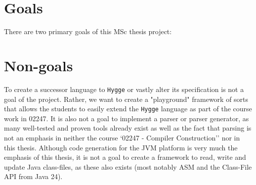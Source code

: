 \section{Goals}

There are two primary goals of this MSc thesis project:

\section{Non-goals}

To create a successor language to \texttt{Hygge} or vastly alter its specification is not a goal of the project. Rather, we want to create a
"playground" framework of sorts that allows the students to easily extend the \texttt{Hygge} language as part of the course work in 02247. 
It is also not a goal to implement a parser or parser generator, as many well-tested and proven tools already exist as well as the fact that
parsing is not an emphasis in neither the course `02247 - Compiler Construction'' nor in this thesis. Although code generation for the JVM platform
is very much the emphasis of this thesis, it is not a goal to create a framework to read, write and update Java class-files, as these also exists 
(most notably ASM and the Class-File API from Java 24).
